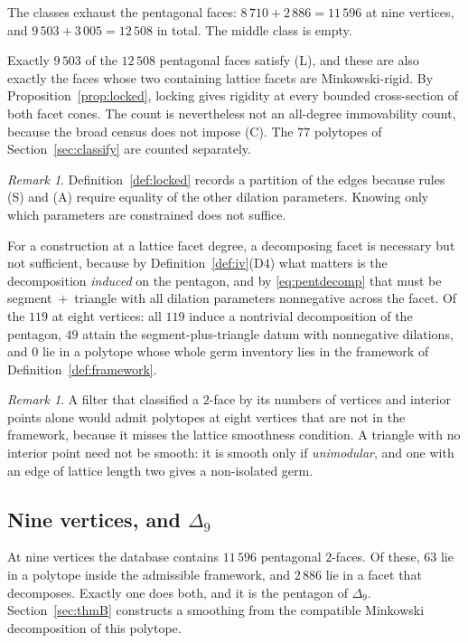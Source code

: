 \documentclass[11pt]{amsart}
\theoremstyle{definition}
\theoremstyle{remark}
\newtheorem{remark}[theorem]{Remark}
\theoremstyle{plain}
\begin{document}
The classes exhaust the pentagonal faces:
$8\,710+2\,886=11\,596$ at nine vertices, and
$9\,503+3\,005=12\,508$ in total.  The middle class is empty.

Exactly $9\,503$ of the $12\,508$ pentagonal faces satisfy
{\rm(L)}, and these are also exactly the faces whose two containing
lattice facets are Minkowski-rigid.  By Proposition~\ref{prop:locked},
locking gives rigidity at every bounded cross-section of both facet cones.
The count is nevertheless not an all-degree immovability count,
because the broad census does not impose {\rm(C)}.
The $77$ polytopes of Section~\ref{sec:classify} are counted separately.

\begin{remark}\label{rem:flatset}
Definition~\ref{def:locked} records a partition of the edges because
rules (S) and (A) require equality of the other dilation parameters.
Knowing only which parameters are constrained does not suffice.
\end{remark}

For a construction at a lattice facet degree, a decomposing facet is
necessary but not sufficient, because by
Definition~\ref{def:iv}(D4) what matters is the decomposition
\emph{induced} on the pentagon, and by \eqref{eq:pentdecomp} that must be
segment~$+$~triangle with all dilation parameters nonnegative across the facet.
Of the $119$ at eight vertices: all $119$ induce a nontrivial decomposition of
the pentagon, $49$ attain the segment-plus-triangle datum with nonnegative
dilations, and $0$ lie in a polytope whose whole germ inventory lies in the
framework of Definition~\ref{def:framework}.

\begin{remark}\label{rem:censuscorrection}
A filter that classified a $2$-face by its numbers of vertices and interior
points alone would admit polytopes at eight vertices that are not in the
framework, because it misses the lattice smoothness condition.  A triangle with
no interior point need not be smooth: it is smooth only if \emph{unimodular},
and one with an edge of lattice length two gives a non-isolated germ.
\end{remark}

\subsection{Nine vertices, and \texorpdfstring{$\Delta_9$}{Delta9}}
At nine vertices the database contains $11\,596$ pentagonal $2$-faces.  Of
these, $63$ lie in a polytope inside the admissible framework, and $2\,886$ lie
in a facet that decomposes.  Exactly one does both, and it is the pentagon of
$\Delta_9$.  Section~\ref{sec:thmB} constructs a smoothing from the compatible
Minkowski decomposition of this polytope.
\end{document}
